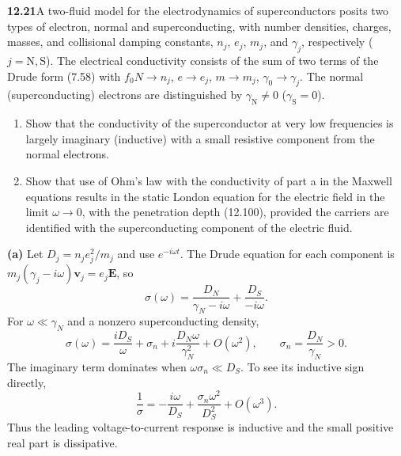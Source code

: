 \par\bigskip
\noindent\textbf{12.21}\quad A two-fluid model for the electrodynamics of superconductors posits two types of electron, normal and superconducting, with number densities, charges, masses, and collisional damping constants, $n_{j}$, $e_{j}$, $m_{j}$, and $\gamma_{j}$, respectively ($j=\mathrm{N},\mathrm{S}$). The electrical conductivity consists of the sum of two terms of the Drude form (7.58) with $f_{0}N\to n_{j}$, $e\to e_{j}$, $m\to m_{j}$, $\gamma_{0}\to\gamma_{j}$. The normal (superconducting) electrons are distinguished by $\gamma_{\mathrm{N}}\neq0$ ($\gamma_{\mathrm{S}}=0$).
\begin{enumerate}
\item[(a)] Show that the conductivity of the superconductor at very low frequencies is largely imaginary (inductive) with a small resistive component from the normal electrons.
\item[(b)] Show that use of Ohm's law with the conductivity of part a in the Maxwell equations results in the static London equation for the electric field in the limit $\omega\to0$, with the penetration depth (12.100), provided the carriers are identified with the superconducting component of the electric fluid.
\end{enumerate}
\solution

\medskip\noindent\textbf{(a)} Let $D_j=n_je_j^2/m_j$ and use $e^{-i\omega t}$.
The Drude equation for each component is
$m_j(\gamma_j-i\omega)\mathbf v_j=e_j\mathbf E$, so
\[
\sigma(\omega)=\frac{D_N}{\gamma_N-i\omega}+\frac{D_S}{-i\omega}.
\]
For $\omega\ll\gamma_N$ and a nonzero superconducting density,
\[
\boxed{\sigma(\omega)=\frac{iD_S}{\omega}+\sigma_n
+i\frac{D_N\omega}{\gamma_N^2}+O(\omega^2),
\qquad \sigma_n=\frac{D_N}{\gamma_N}>0.}
\]
The imaginary term dominates when
$\omega\sigma_n\ll D_S$.  To see its inductive sign directly,
\[
\frac1\sigma=-\frac{i\omega}{D_S}
+\frac{\sigma_n\omega^2}{D_S^2}+O(\omega^3).
\]
Thus the leading voltage-to-current response is inductive and the
small positive real part is dissipative.

